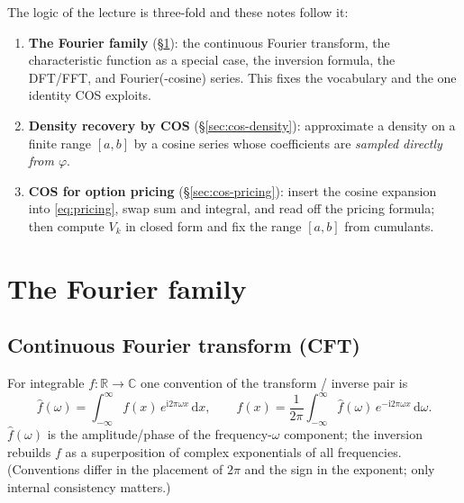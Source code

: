 \documentclass[11pt]{article}
\newcommand{\R}{\mathbb{R}}
\newcommand{\C}{\mathbb{C}}
\newcommand{\ii}{\mathrm{i}}
\newcommand{\dd}{\,\mathrm{d}}
\newcommand{\ch}{\varphi}
\begin{document}
The logic of the lecture is three-fold and these notes follow it:
\begin{enumerate}[leftmargin=*]
  \item \textbf{The Fourier family} (\S\ref{sec:family}): the continuous Fourier transform, the characteristic
  function as a special case, the inversion formula, the DFT/FFT, and Fourier(-cosine) series. This fixes the
  vocabulary and the one identity COS exploits.
  \item \textbf{Density recovery by COS} (\S\ref{sec:cos-density}): approximate a density on a finite range
  $[a,b]$ by a cosine series whose coefficients are \emph{sampled directly from $\ch$}.
  \item \textbf{COS for option pricing} (\S\ref{sec:cos-pricing}): insert the cosine expansion into
  \eqref{eq:pricing}, swap sum and integral, and read off the pricing formula; then compute $V_k$ in closed
  form and fix the range $[a,b]$ from cumulants.
\end{enumerate}

\section{The Fourier family}\label{sec:family}

\subsection{Continuous Fourier transform (CFT)}
For integrable $f:\R\to\C$ one convention of the transform / inverse pair is
\begin{equation}\label{eq:cft}
\hat f(\omega)=\int_{-\infty}^{\infty} f(x)\,e^{\ii 2\pi\omega x}\dd x,
\qquad
f(x)=\frac{1}{2\pi}\int_{-\infty}^{\infty}\hat f(\omega)\,e^{-\ii 2\pi\omega x}\dd\omega .
\end{equation}
$\hat f(\omega)$ is the amplitude/phase of the frequency-$\omega$ component; the inversion rebuilds $f$ as a
superposition of complex exponentials of all frequencies. (Conventions differ in the placement of $2\pi$ and
the sign in the exponent; only internal consistency matters.)
\end{document}
